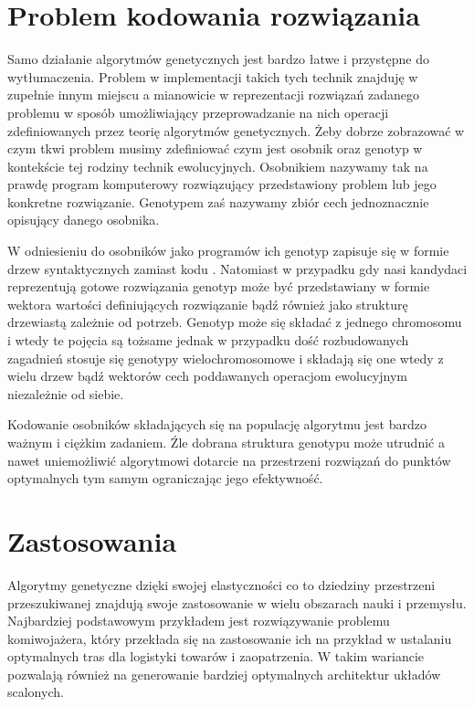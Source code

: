 \documentclass[12pt, oneside, a4paper]{report}
\begin{document}
\section{Problem kodowania rozwiązania}

Samo działanie algorytmów genetycznych jest bardzo łatwe i przystępne do wytłumaczenia. Problem w implementacji takich tych technik znajduję w zupełnie innym miejscu a mianowicie w reprezentacji rozwiązań zadanego problemu w sposób umożliwiający przeprowadzanie na nich operacji zdefiniowanych przez teorię algorytmów genetycznych. Żeby dobrze zobrazować w czym tkwi problem musimy zdefiniować czym jest osobnik oraz genotyp w kontekście tej rodziny technik ewolucyjnych. Osobnikiem nazywamy tak na prawdę program komputerowy rozwiązujący przedstawiony problem lub jego konkretne rozwiązanie. Genotypem zaś nazywamy zbiór cech jednoznacznie opisujący danego osobnika. 

W odniesieniu do osobników jako programów ich genotyp zapisuje się w formie drzew syntaktycznych zamiast kodu \citep{poli08:fieldguide}. Natomiast w przypadku gdy nasi kandydaci reprezentują gotowe rozwiązania genotyp może być przedstawiany w formie wektora wartości definiujących rozwiązanie bądź również jako strukturę drzewiastą zależnie od potrzeb. Genotyp może się składać z jednego chromosomu i wtedy te pojęcia są tożsame jednak w przypadku dość rozbudowanych zagadnień stosuje się genotypy wielochromosomowe i składają się one wtedy z wielu drzew bądź wektorów cech poddawanych operacjom ewolucyjnym niezależnie od siebie.

Kodowanie osobników składających się na populację algorytmu jest bardzo ważnym i ciężkim zadaniem. Źle dobrana struktura genotypu może utrudnić a nawet uniemożliwić algorytmowi dotarcie na przestrzeni rozwiązań do punktów optymalnych tym samym ograniczając jego efektywność.

\section{Zastosowania}

Algorytmy genetyczne dzięki swojej elastyczności co  to dziedziny przestrzeni przeszukiwanej znajdują swoje zastosowanie w wielu obszarach nauki i przemysłu. Najbardziej podstawowym przykładem jest rozwiązywanie problemu komiwojażera, który przekłada się na zastosowanie ich na przykład w ustalaniu optymalnych tras dla logistyki towarów i zaopatrzenia. W takim wariancie pozwalają również na generowanie bardziej optymalnych architektur układów scalonych.
\end{document}

